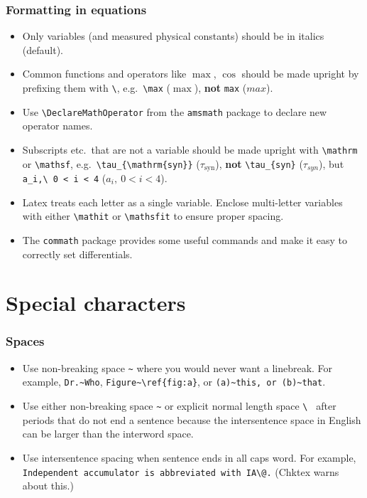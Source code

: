 \documentclass[aspectratio=1610,hyperref={colorlinks,linkcolor=}]{beamer}
\newcommand{\pkg}[1]{\texttt{#1}}
\begin{document}
\begin{frame}[fragile]
    \frametitle{Formatting in equations}
    \begin{itemize}
        \item Only variables (and measured physical constants) should be in italics (default).
        \item Common functions and operators like $\max$, $\cos$ should be made upright by prefixing them with \verb+\+, e.g.~\verb+\max+ ($\max$), \textbf{not} \verb+max+ ($max$). %
        \item Use \verb+\DeclareMathOperator+ from the \pkg{amsmath} package to declare new operator names.
        \item Subscripts etc.~that are not a variable should be made upright with \verb+\mathrm+ or \verb+\mathsf+, e.g.~\verb+\tau_{\mathrm{syn}}+ ($\tau_{\mathrm{syn}}$), \textbf{not} \verb+\tau_{syn}+ ($\tau_{syn}$), but \verb+a_i,\ 0 < i < 4+ ($a_i,\ 0 < i < 4$).
        \item Latex treats each letter as a single variable. Enclose multi-letter variables with either \verb+\mathit+ or \verb+\mathsfit+ to ensure proper spacing.
        \item The \pkg{commath} package provides some useful commands and make it easy to correctly set differentials.
    \end{itemize}
\end{frame}

\section{Special characters}
\begin{frame}[fragile]
    \frametitle{Spaces}
    \begin{itemize}
        \item Use non-breaking space \verb+~+ where you would never want a linebreak. For example, \verb+Dr.~Who+, \verb+Figure~\ref{fig:a}+, or \verb+(a)~this, or (b)~that+.
        \item Use either non-breaking space \verb+~+ or explicit normal length space \verb*+\ + after periods that do not end a sentence because the intersentence space in English can be larger than the interword space.
        \item Use intersentence spacing when sentence ends in all caps word. For example, \verb+Independent accumulator is abbreviated with IA\@.+ (Chktex warns about this.)
    \end{itemize}
\end{frame}
\end{document}
